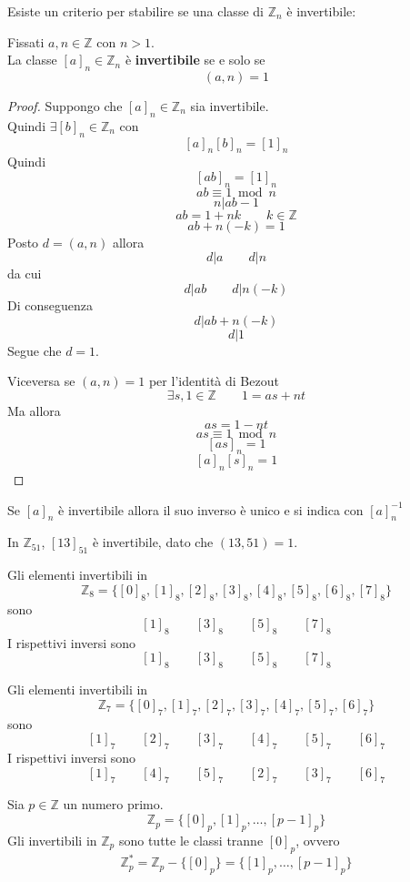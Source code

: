 \documentclass[a4paper,12pt, oneside]{book}
\begin{document}
Esiste un criterio per stabilire se una classe di $\mathbb{Z}_n$ è invertibile:
\begin{teorema}
	Fissati $a, n \in \mathbb{Z}$ con $n>1$.\\
	La classe $[a]_n \in \mathbb{Z}_n$ è \textbf{invertibile} se e solo se $$(a,n)=1$$

	\begin{proof}
		Suppongo che $[a]_n \in \mathbb{Z}_n$ sia invertibile.\\
		Quindi $\exists [b]_n \in \mathbb{Z}_n$ con $$[a]_n[b]_n=[1]_n$$
		Quindi
		$$[ab]_n = [1]_n$$
		$$ab \equiv 1 \bmod n$$
		$$n|ab-1$$
		$$ab=1+nk \qquad k \in \mathbb{Z}$$
		$$ab+n(-k) =1$$
		Posto $d = (a,n)$ allora $$d|a \qquad d|n$$ da cui $$d|ab \qquad d|n(-k)$$
		Di conseguenza $$d|ab+n(-k)$$ $$d|1$$
		Segue che $d=1$.

		Viceversa se $(a,n)=1$ per l'identità di Bezout $$\exists s,1 \in \mathbb{Z} \qquad 1=as+nt$$
		Ma allora $$as=1-nt$$ $$as \equiv 1 \bmod n$$ $$[as]_n= 1$$ $$[a]_n [s]_n = 1$$
	\end{proof}
\end{teorema}
\begin{osservazione}
	Se $[a]_n$ è invertibile allora il suo inverso è unico e si indica con $[a]_n^{-1}$
\end{osservazione}
\begin{shaded}
	\begin{esempio}
		In $\mathbb{Z}_{51}$, $[13]_{51}$ è invertibile, dato che $(13,51)=1$.
	\end{esempio}
	\begin{esempio}
		Gli elementi invertibili in $$\mathbb{Z}_8 = \{ [0]_8, [1]_8, [2]_8, [3]_8, [4]_8, [5]_8, [6]_8, [7]_8 \}$$ sono
		$$[1]_8 \qquad [3]_8 \qquad [5]_8 \qquad [7]_8$$
		I rispettivi inversi sono
		$$[1]_8 \qquad [3]_8 \qquad [5]_8 \qquad [7]_8$$
	\end{esempio}
	\begin{esempio}
		Gli elementi invertibili in $$\mathbb{Z}_7 = \{ [0]_7, [1]_7, [2]_7, [3]_7, [4]_7, [5]_7, [6]_7 \}$$ sono
		$$[1]_7 \qquad [2]_7 \qquad [3]_7 \qquad [4]_7 \qquad [5]_7 \qquad [6]_7$$
		I rispettivi inversi sono
		$$[1]_7 \qquad [4]_7 \qquad [5]_7 \qquad [2]_7 \qquad [3]_7 \qquad [6]_7$$

		\begin{nota}
			Sia $p \in \mathbb{Z}$ un numero primo.
			$$\mathbb{Z}_p = \{ [0]_p, [1]_p, \dots, [p-1]_p \}$$
			Gli invertibili in $\mathbb{Z}_p$ sono tutte le classi tranne $[0]_p$, ovvero
			$$\mathbb{Z}_p^{*} = \mathbb{Z}_p - \{ [0]_p \} = \{ [1]_p, \dots, [p-1]_p \}$$
		\end{nota}
	\end{esempio}
\end{shaded}
\end{document}
